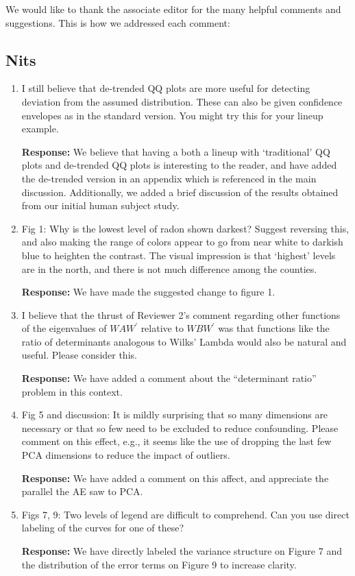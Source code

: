 \documentclass{article}
\begin{document}
We would like to thank the associate editor for the many helpful comments and suggestions. 
This is how we addressed each comment:

\subsection*{Nits}

\begin{enumerate}
\item I still believe that de-trended QQ plots are more useful for detecting deviation from the assumed distribution. These can also be given confidence envelopes as in the standard version. You might try this for your lineup example.

\textbf{Response:} We believe that having a both a lineup with `traditional' QQ plots and de-trended QQ plots is interesting to the reader, and have added the de-trended version in an appendix which is referenced in the main discussion. Additionally, we added a brief discussion of the results obtained from our initial human subject study. 


\item Fig 1: Why is the lowest level of radon shown darkest? Suggest reversing this, and also making the range of colors appear to go from near white to darkish blue to heighten the contrast. The visual impression is that `highest' levels are in the north, and there is not much difference among the counties.

\textbf{Response:} We have made the suggested change to figure 1.


\item I believe that the thrust of Reviewer 2's comment regarding other functions of the eigenvalues of $WAW^\prime$ relative to $WBW^\prime$ was that functions like the ratio of determinants analogous to Wilks' Lambda would also be natural and useful. Please consider this.

\textbf{Response:} We have added a comment about the ``determinant ratio'' problem in this context.

\item Fig 5 and discussion: It is mildly surprising that so many dimensions are necessary or that so few need to be excluded to reduce confounding. Please comment on this effect, e.g., it seems like the use of dropping the last few PCA dimensions to reduce the impact of outliers.

\textbf{Response:} We have added a comment on this affect, and appreciate the parallel the AE saw to PCA.


\item Figs 7, 9: Two levels of legend are difficult to comprehend. Can you use direct labeling of the curves for one of these?

\textbf{Response:} We have directly labeled the variance structure on Figure 7 and the distribution of the error terms on Figure 9 to increase clarity.

\end{enumerate}
\end{document}
